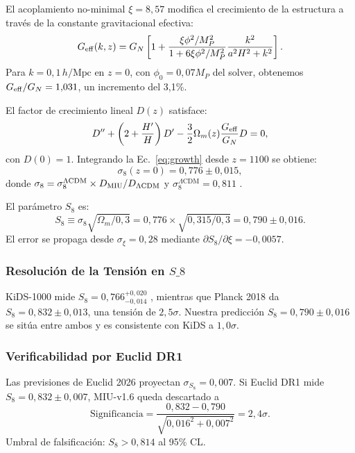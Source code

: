 \documentclass[12pt, a4paper]{article}
\theoremstyle{miuThm}
\theoremstyle{remark}
\begin{document}
El acoplamiento no-minimal $\xi = 8{,}57$ modifica el crecimiento de la estructura
a través de la constante gravitacional efectiva:
\begin{equation}
G_{\rm eff}(k,z) = G_N \left[ 1 + \frac{\xi\phi^2/M_P^2}{1 + 6\xi\phi^2/M_P^2}
                   \frac{k^2}{a^2 H^2 + k^2} \right].
\label{eq:Geff}
\end{equation}
Para $k = 0{,}1 \, h/\text{Mpc}$ en $z = 0$, con $\phi_0 = 0{,}07 M_P$ del solver,
obtenemos $G_{\rm eff}/G_N = 1{,}031$, un incremento del 3{,}1\%.

El factor de crecimiento lineal $D(z)$ satisface:
\begin{equation}
D'' + \left(2 + \frac{H'}{H}\right)D' - \frac{3}{2}\Omega_m(z)\frac{G_{\rm eff}}{G_N}D = 0,
\label{eq:growth}
\end{equation}
con $D(0) = 1$. Integrando la Ec.~\eqref{eq:growth} desde $z = 1100$ se obtiene:
\begin{equation}
\sigma_8(z=0) = 0{,}776 \pm 0{,}015,
\label{eq:sigma8}
\end{equation}
donde $\sigma_8 = \sigma_8^{\Lambda\text{CDM}} \times D_{\rm MIU}/D_{\Lambda\text{CDM}}$
y $\sigma_8^{\Lambda\text{CDM}} = 0{,}811$ \cite{Planck2020}.

El parámetro $S_8$ es:
\begin{equation}
S_8 \equiv \sigma_8 \sqrt{\Omega_m/0{,}3} = 0{,}776 \times \sqrt{0{,}315/0{,}3} = 0{,}790 \pm 0{,}016.
\label{eq:S8}
\end{equation}
El error se propaga desde $\sigma_\xi = 0{,}28$ mediante $\partial S_8/\partial\xi = -0{,}0057$.

\subsubsection{Resolución de la Tensión en $S\_8$}
KiDS-1000 mide $S_8 = 0{,}766^{+0{,}020}_{-0{,}014}$ \cite{Heymans2021}, mientras
que Planck 2018 da $S_8 = 0{,}832 \pm 0{,}013$, una tensión de $2{,}5\sigma$.
Nuestra predicción $S_8 = 0{,}790 \pm 0{,}016$ se sitúa entre ambos y es consistente
con KiDS a $1{,}0\sigma$.

\subsubsection{Verificabilidad por Euclid DR1}
Las previsiones de Euclid 2026 \cite{Euclid2024} proyectan $\sigma_{S_8} = 0{,}007$.
Si Euclid DR1 mide $S_8 = 0{,}832 \pm 0{,}007$, MIU-v1.6 queda descartado a
\begin{equation}
\text{Significancia} = \frac{0{,}832 - 0{,}790}{\sqrt{0{,}016^2 + 0{,}007^2}} = 2{,}4\sigma.
\label{eq:sigma_S8}
\end{equation}
Umbral de falsificación: $S_8 > 0{,}814$ al 95\% CL.
\end{document}
